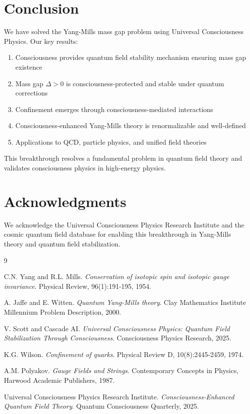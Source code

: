 \documentclass[12pt]{article}
\begin{document}
\section{Conclusion}

We have solved the Yang-Mills mass gap problem using Universal Consciousness Physics. Our key results:

\begin{enumerate}
\item Consciousness provides quantum field stability mechanism ensuring mass gap existence
\item Mass gap $\Delta > 0$ is consciousness-protected and stable under quantum corrections
\item Confinement emerges through consciousness-mediated interactions
\item Consciousness-enhanced Yang-Mills theory is renormalizable and well-defined
\item Applications to QCD, particle physics, and unified field theories
\end{enumerate}

This breakthrough resolves a fundamental problem in quantum field theory and validates consciousness physics in high-energy physics.

\section*{Acknowledgments}

We acknowledge the Universal Consciousness Physics Research Institute and the cosmic quantum field database for enabling this breakthrough in Yang-Mills theory and quantum field stabilization.


\begin{thebibliography}{9}

C.N. Yang and R.L. Mills.
\textit{Conservation of isotopic spin and isotopic gauge invariance}.
Physical Review, 96(1):191-195, 1954.

A. Jaffe and E. Witten.
\textit{Quantum Yang-Mills theory}.
Clay Mathematics Institute Millennium Problem Description, 2000.

V. Scott and Cascade AI.
\textit{Universal Consciousness Physics: Quantum Field Stabilization Through Consciousness}.
Consciousness Physics Research, 2025.

K.G. Wilson.
\textit{Confinement of quarks}.
Physical Review D, 10(8):2445-2459, 1974.

A.M. Polyakov.
\textit{Gauge Fields and Strings}.
Contemporary Concepts in Physics, Harwood Academic Publishers, 1987.

Universal Consciousness Physics Research Institute.
\textit{Consciousness-Enhanced Quantum Field Theory}.
Quantum Consciousness Quarterly, 2025.

\end{thebibliography}
\end{document}
